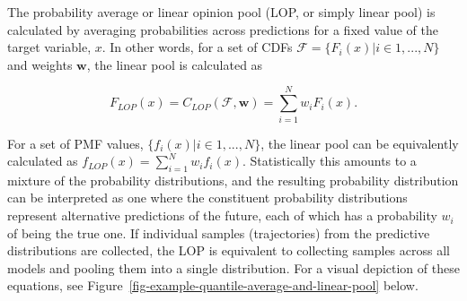 \documentclass[
]{article}
\begin{document}
The probability average or linear opinion pool (LOP, or simply linear
pool) is calculated by averaging probabilities across predictions for a
fixed value of the target variable, \(x\). In other words, for a set of
CDFs \(\mathcal{F} = \{F_i(x)| i \in 1,...,N \}\) and weights
\(\pmb{w}\), the linear pool is calculated as

\[
F_{LOP}(x) = C_{LOP}(\mathcal{F}, \pmb{w}) = \sum_{i = 1}^Nw_iF_i(x). 
\]

For a set of PMF values, \(\{f_i(x)|i \in 1, ..., N\}\), the linear pool
can be equivalently calculated as
\(f_{LOP}(x) = \sum_{i = 1}^N w_i f_i(x)\). Statistically this amounts
to a mixture of the probability distributions, and the resulting
probability distribution can be interpreted as one where the constituent
probability distributions represent alternative predictions of the
future, each of which has a probability \(w_i\) of being the true one.
If individual samples (trajectories) from the predictive distributions
are collected, the LOP is equivalent to collecting samples across all
models and pooling them into a single distribution. For a visual
depiction of these equations, see
Figure~\ref{fig-example-quantile-average-and-linear-pool} below.
\end{document}

